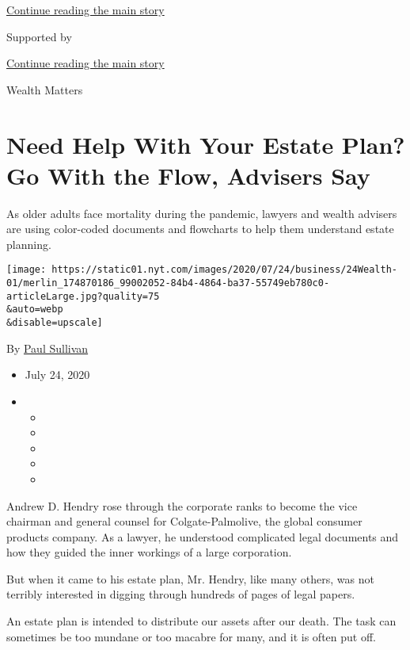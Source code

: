 \protect\hyperlink{after-top}{Continue reading the main story}

Supported by

\protect\hyperlink{after-sponsor}{Continue reading the main story}

Wealth Matters

\hypertarget{need-help-with-your-estate-plan-go-with-the-flow-advisers-say}{%
\section{Need Help With Your Estate Plan? Go With the Flow, Advisers
Say}\label{need-help-with-your-estate-plan-go-with-the-flow-advisers-say}}

As older adults face mortality during the pandemic, lawyers and wealth
advisers are using color-coded documents and flowcharts to help them
understand estate planning.

\texttt{[image: https://static01.nyt.com/images/2020/07/24/business/24Wealth-01/merlin\_174870186\_99002052-84b4-4864-ba37-55749eb780c0-articleLarge.jpg?quality=75\\\&auto=webp\\\&disable=upscale]}

By \href{https://www.nytimes.com/by/paul-sullivan}{Paul Sullivan}

\begin{itemize}
\item
  July 24, 2020
\item
  \begin{itemize}
  \item
  \item
  \item
  \item
  \item
  \end{itemize}
\end{itemize}

Andrew D. Hendry rose through the corporate ranks to become the vice
chairman and general counsel for Colgate-Palmolive, the global consumer
products company. As a lawyer, he understood complicated legal documents
and how they guided the inner workings of a large corporation.

But when it came to his estate plan, Mr. Hendry, like many others, was
not terribly interested in digging through hundreds of pages of legal
papers.

An estate plan is intended to distribute our assets after our death. The
task can sometimes be too mundane or too macabre for many, and it is
often put off.

